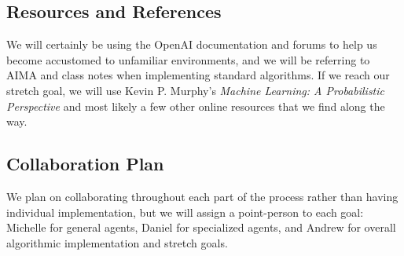 \documentclass{NSF}
\begin{document}
\subsection{Resources and References}
We will certainly be using the OpenAI documentation and forums to help us become accustomed to unfamiliar environments, and we will be referring to AIMA and class notes when implementing standard algorithms. If we reach our stretch goal, we will use Kevin P. Murphy's \emph{Machine Learning: A Probabilistic Perspective} and most likely a few other online resources that we find along the way.

\subsection{Collaboration Plan}
We plan on collaborating throughout each part of the process rather than having individual implementation, but we will assign a point-person to each goal: Michelle for general agents, Daniel for specialized agents, and Andrew for overall algorithmic implementation and stretch goals.
\end{document}
